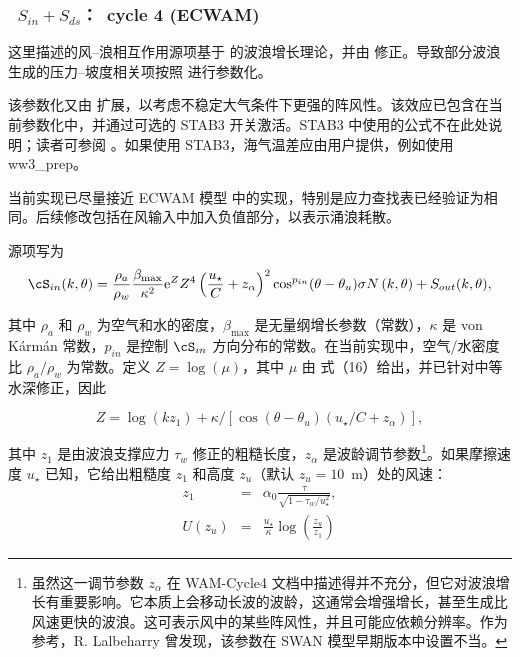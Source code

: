 \vsssub
\subsubsection{~$S_{in} + S_{ds}$：\wam\ cycle 4 (ECWAM)} \label{sec:ST3}
\vsssub


\noindent 
这里描述的风--浪相互作用源项基于 \cite{art:Miles57} 的波浪增长理论，并由 \cite{art:Jan82} 修正。导致部分波浪生成的压力--坡度相关项按照 \cite{art:Jan91} 进行参数化。

该参数化又由 \cite{rep:AB02} 扩展，以考虑不稳定大气条件下更强的阵风性。该效应已包含在当前参数化中，并通过可选的 {\code STAB3} 开关激活。{\code STAB3} 中使用的公式不在此处说明；读者可参阅 \cite{rep:AB02}。如果使用 {\code STAB3}，海气温差应由用户提供，例如使用 {\file ww3\_prep}。

当前实现已尽量接近 ECWAM 模型 \citep{rep:Bea05} 中的实现，特别是应力查找表已经验证为相同。后续修改包括在风输入中加入负值部分，以表示涌浪耗散。

源项写为 \citep{bk:Jan04}
\begin{equation}
\cS_{in}(k,\theta) =
\frac{\rho_a}{\rho_w}\frac{\beta_{\mathrm{max}}}{\kappa^2}{\mathrm e}^{Z}Z^4
\left(\frac{u_\star}{C}+z_\alpha\right)^2 \cos^{p_{in}}(\theta - \theta_u) \sigma N
\left(k,\theta\right) + S_{out}(k,\theta),\label{eq:SinWAM4}
\end{equation}

\noindent 其中 $\rho_a$ 和 $\rho_w$ 为空气和水的密度，$\beta_{\mathrm{max}}$ 是无量纲增长参数（常数），$\kappa$ 是 von K\'{a}rm\'{a}n 常数，$p_{in}$ 是控制 $\cS_{in}$ 方向分布的常数。在当前实现中，空气/水密度比 ${\rho_a}/{\rho_w}$ 为常数。定义 $Z=\log(\mu)$，其中 $\mu$ 由 \cite{art:Jan91} 式（16）给出，并已针对中等水深修正，因此

\begin{equation}
Z=\log(k z_1)+\kappa/\left[\cos\left(\theta - \theta_u\right)
\left(u_\star/C + z_\alpha \right)\right],
\end{equation}

\noindent
其中 $z_1$ 是由波浪支撑应力 $\tau_w$ 修正的粗糙长度，$z_\alpha$ 是波龄调节参数\footnote{虽然这一调节参数 $z_\alpha$ 在 WAM-Cycle4 文档中描述得并不充分，但它对波浪增长有重要影响。它本质上会移动长波的波龄，这通常会增强增长，甚至生成比风速更快的波浪。这可表示风中的某些阵风性，并且可能应依赖分辨率。作为参考，R. Lalbeharry 曾发现，该参数在 SWAN 模型早期版本中设置不当。}。如果摩擦速度 $u_\star$ 已知，它给出粗糙度 $z_1$ 和高度 $z_u$（默认 $z_u=10$~m）处的风速：
\begin{eqnarray}
z_1&=&\alpha_0 \frac{\tau}{ \sqrt{1-\tau_w/u_\star^2}}, \\
U(z_u)&=&\frac{u_\star}{\kappa} \log\left(\frac{z_u}{z_1}\right) 
\end{eqnarray}

